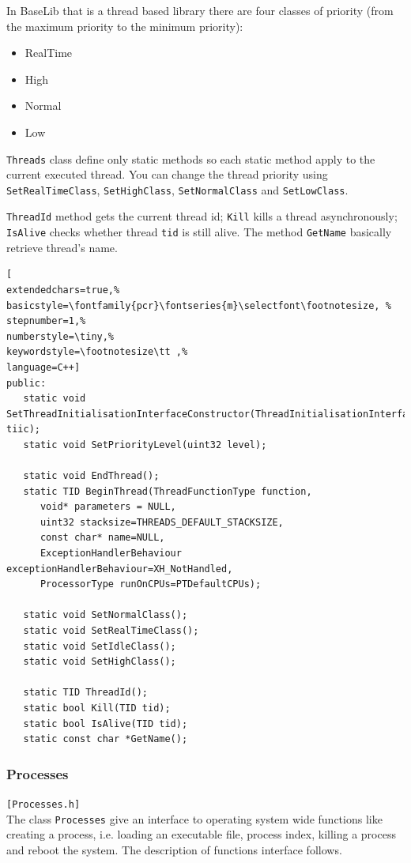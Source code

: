 In BaseLib that is a thread based library there are four classes of priority (from the maximum priority to the minimum priority):
\begin{itemize}
 \item RealTime
 \item High
 \item Normal
 \item Low
\end{itemize}

\texttt{Threads} class define only static methods so each static method apply to the current executed thread. You can change the thread priority using \texttt{SetRealTimeClass}, \texttt{SetHighClass}, \texttt{SetNormalClass} and \texttt{SetLowClass}.

\texttt{ThreadId} method gets the current thread id; \texttt{Kill} kills a thread asynchronously; \texttt{IsAlive} checks whether thread \texttt{tid} is still alive. The method \texttt{GetName} basically retrieve thread's name.

\begin{lstlisting}[
extendedchars=true,%
basicstyle=\fontfamily{pcr}\fontseries{m}\selectfont\footnotesize, %
stepnumber=1,%
numberstyle=\tiny,%
keywordstyle=\footnotesize\tt ,%
language=C++]
public:
   static void SetThreadInitialisationInterfaceConstructor(ThreadInitialisationInterfaceConstructorType tiic);
   static void SetPriorityLevel(uint32 level);

   static void EndThread();
   static TID BeginThread(ThreadFunctionType function,
      void* parameters = NULL,
      uint32 stacksize=THREADS_DEFAULT_STACKSIZE,
      const char* name=NULL,
      ExceptionHandlerBehaviour exceptionHandlerBehaviour=XH_NotHandled,
      ProcessorType runOnCPUs=PTDefaultCPUs);

   static void SetNormalClass();
   static void SetRealTimeClass();
   static void SetIdleClass();
   static void SetHighClass();

   static TID ThreadId();
   static bool Kill(TID tid);
   static bool IsAlive(TID tid);
   static const char *GetName();
\end{lstlisting}



\subsubsection{Processes}
\texttt{[Processes.h]}\\
The class \texttt{Processes} give an interface to operating system wide functions like creating a process, i.e. loading an executable file, process index, killing a process and reboot the system. The description of functions interface follows.\\

